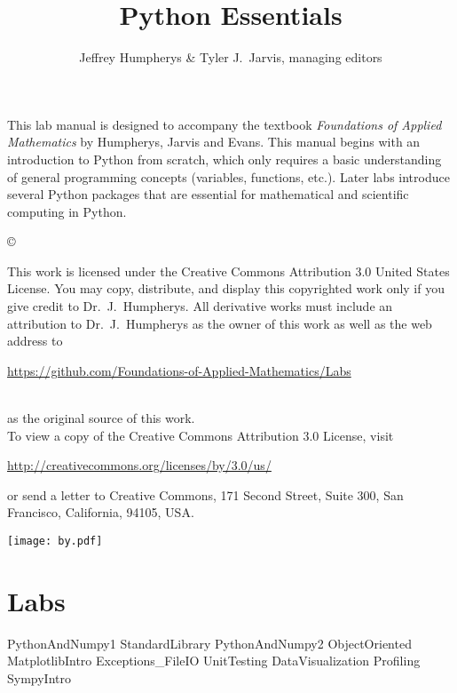 \documentclass[opener-c,labs,black,nociteref]{HJnewsiambook}
\title{Python Essentials}
\author{Jeffrey Humpherys \& Tyler J.~Jarvis, managing editors}
\begin{document}

\thispagestyle{empty} %
\maketitle
\thispagestyle{empty}
\frontmatter



\begin{thepreface} %

This lab manual is designed to accompany the textbook \emph{Foundations of Applied Mathematics} by Humpherys, Jarvis and Evans.
This manual begins with an introduction to Python \cite{vanrossum2010python} from scratch, which only requires a basic understanding of general programming concepts (variables, functions, etc.).
Later labs introduce several Python packages that are essential for mathematical and scientific computing in Python.

\vfill
\copyright{This work is licensed under the Creative Commons Attribution 3.0 United States
License.  You may copy, distribute, and display this copyrighted work only if you give
credit to Dr.~J.~Humpherys. All derivative works must include an attribution to Dr.~J.~Humpherys as the owner of this work as well as the web address to
\\\centerline{\url{https://github.com/Foundations-of-Applied-Mathematics/Labs}}\\as the original source of this work.
\\To view a copy of the Creative Commons Attribution 3.0 License, visit
\\\centerline{\url{http://creativecommons.org/licenses/by/3.0/us/}} or send a letter to Creative Commons, 171 Second Street, Suite 300, San Francisco, California, 94105, USA.}

\vfill
\centering\texttt{[image: by.pdf]}
\vfill
\end{thepreface}

\setcounter{tocdepth}{1}
\tableofcontents

\mainmatter %

\part{Labs}
{PythonAndNumpy1}
{StandardLibrary}
{PythonAndNumpy2}
{ObjectOriented}
{MatplotlibIntro}
{Exceptions_FileIO}
{UnitTesting}
{DataVisualization}
{Profiling}
{SympyIntro}
\end{document}
